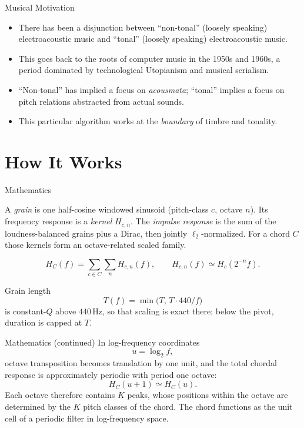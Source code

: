 \documentclass{beamer}
\begin{document}
\begin{frame}{Musical Motivation}
  \begin{itemize}
		\item
			There has been a disjunction between ``non-tonal'' (loosely speaking)
			electroacoustic music and ``tonal'' (loosely speaking) electroacoustic music.
		\item 
		    This goes back to the roots of computer music in the 1950s and 1960s, a
		    period dominated by technological Utopianism and musical serialism.
		\item ``Non-tonal'' has implied a focus on \emph{acousmata}; ``tonal'' implies a
		focus on pitch relations abstracted from actual sounds.
		\item This particular algorithm works at the \emph{boundary} of timbre and
		tonality.
\end{itemize}
\end{frame}

\section{How It Works}

\begin{frame}{Mathematics}

A \emph{grain} is one half-cosine windowed sinusoid (pitch-class $c$, octave
$n$). Its frequency response is a \emph{kernel} $H_{c,n}$. The
\emph{impulse response} is the sum of the loudness-balanced grains plus a
Dirac, then jointly $\ell_2$-normalized. For a chord $C$ those kernels form
an octave-related scaled family.

\[
	H_C(f)
	=
	\sum_{c\in C}\sum_n H_{c,n}(f),
	\qquad
	H_{c,n}(f)
	\simeq
	H_c\!\left(2^{-n}f\right).
\]

Grain length
\[
T(f)=\min\bigl(T,\,T\cdot 440/f\bigr)
\]
is constant-$Q$ above $440\,\mathrm{Hz}$, so that scaling is exact there;
below the pivot, duration is capped at $T$.

\end{frame}

\begin{frame}{Mathematics (continued)}
In log-frequency coordinates
\[
	u=\log_2 f,
\]
octave transposition becomes translation by one unit, and the total chordal
response is approximately periodic with period one octave:
\[
	H_C(u+1)\simeq H_C(u).
\]
Each octave therefore contains $K$ peaks, whose positions within the octave are
determined by the $K$ pitch classes of the chord. The chord functions as the
unit cell of a periodic filter in log-frequency space.
\end{frame}
\end{document}
